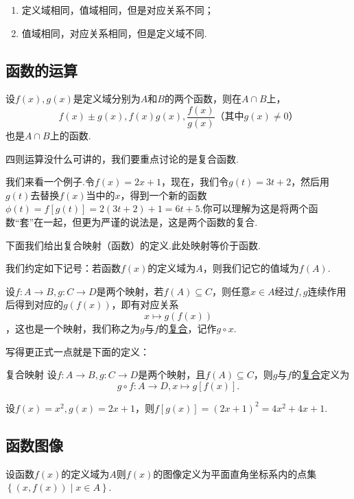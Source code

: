 \documentclass[lang=cn,math=cm,chinesefont=nofont,11pt,scheme=chinese,twocol]{elegantbook}
\begin{document}
\begin{enumerate}
  \item 定义域相同，值域相同，但是对应关系不同；
  \item 值域相同，对应关系相同，但是定义域不同.
\end{enumerate}

\subsection{函数的运算}

设$f(x),g(x)$是定义域分别为$A$和$B$的两个函数，则在$A\cap B$上，$$f(x)\pm g(x),f(x)g(x),\dfrac{f(x)}{g(x)}\text{（其中}g(x)\neq 0\text{）}$$也是$A\cap B$上的函数.

四则运算没什么可讲的，我们要重点讨论的是复合函数.

我们来看一个例子.令$f(x)=2x+1$，现在，我们令$g(t)=3t+2$，然后用$g(t)$去替换$f(x)$当中的$x$，得到一个新的函数$\phi(t)=f[g(t)]=2(3t+2)+1=6t+5$.你可以理解为这是将两个函数“套”在一起，但更为严谨的说法是，这是两个函数的复合.

下面我们给出复合映射（函数）的定义.此处映射等价于函数.

\begin{remark}
  我们约定如下记号：若函数$f(x)$的定义域为$A$，则我们记它的值域为$f(A)$.
\end{remark}

设$f:A\rightarrow B,g:C\rightarrow D$是两个映射，若$f(A)\subseteq C$，则任意$x\in A$经过$f,g$连续作用后得到对应的$g(f(x))$，即有对应关系$$x\mapsto g(f(x))$$，这也是一个映射，我们称之为$g$与$f$的\underline{复合}，记作$g\circ x$.

写得更正式一点就是下面的定义：

\begin{definition}{复合映射}
  设$f:A\rightarrow B,g:C\rightarrow D$是两个映射，且$f(A)\subseteq C$，则$g$与$f$的\underline{复合}定义为$$g\circ f:A\rightarrow D,x\mapsto g[f(x)].$$
\end{definition}

\begin{example}
  设$f(x)=x^2,g(x)=2x+1$，则$f[g(x)]=(2x+1)^2=4x^2+4x+1$.
\end{example}

\subsection{函数图像}

\begin{definition}
  设函数$f(x)$的定义域为$A$则$f(x)$的图像定义为平面直角坐标系内的点集$\left\{(x,f(x))\mid x\in A\right\}$.
\end{definition}
\end{document}

